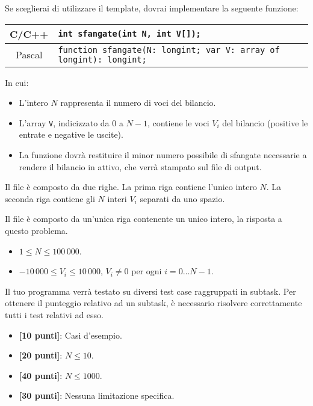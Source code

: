 Se sceglierai di utilizzare il template, dovrai implementare la seguente funzione:
\begin{center}\begin{tabularx}{\textwidth}{|c|X|}
\hline
C/C++  & \verb|int sfangate(int N, int V[]);|\\
\hline
Pascal & \verb|function sfangate(N: longint; var V: array of longint): longint;|\\
\hline
\end{tabularx}\end{center}
In cui:
\begin{itemize}[nolistsep]
  \item L'intero $N$ rappresenta il numero di voci del bilancio.
  \item L'array \texttt{V}, indicizzato da $0$ a $N-1$, contiene le voci $V_i$ del bilancio (positive le entrate e negative le uscite).
  \item La funzione dovrà restituire il minor numero possibile di sfangate necessarie a rendere il bilancio in attivo, che verrà stampato sul file di output.
\end{itemize}

\InputFile
Il file  è composto da due righe. La prima riga contiene l'unico intero $N$. La seconda riga contiene gli $N$ interi $V_i$ separati da uno spazio.

\OutputFile
Il file \outputfile{} è composto da un'unica riga contenente un unico intero, la risposta a questo problema.

\Constraints
\begin{itemize}[nolistsep, itemsep=2mm]
	\item $1 \le N \le 100\,000$.
	\item $-10\,000 \le V_i \le 10\,000$, $V_i \ne 0$ per ogni $i=0\ldots N-1$.
\end{itemize}

\Scoring
Il tuo programma verrà testato su diversi test case raggruppati in subtask.
Per ottenere il punteggio relativo ad un subtask, è necessario risolvere
correttamente tutti i test relativi ad esso.

\begin{itemize}[nolistsep,itemsep=2mm]
  \item \textbf{ [10 punti]}: Casi d'esempio.
  \item \textbf{ [20 punti]}: $N \leq 10$.
  \item \textbf{ [40 punti]}: $N \leq 1000$.
  \item \textbf{ [30 punti]}: Nessuna limitazione specifica.
\end{itemize}

